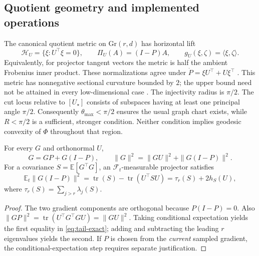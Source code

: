 \subsection{Quotient geometry and implemented operations}

The canonical quotient metric on $\mathrm{Gr}(r,d)$ has horizontal lift
\begin{equation}
 \mathcal H_U=\{\xi:U^\top\xi=0\},\qquad
 \Pi_U(A)=(I-P)A,\qquad g_U(\xi,\zeta)=\langle\xi,\zeta\rangle.
\end{equation}
Equivalently, for projector tangent vectors the metric is half the ambient
Frobenius inner product. These normalizations agree under
$\dot P=\xi U^\top+U\xi^\top$ \cite{bendokat2024grassmann}.
This metric has nonnegative sectional curvature bounded by $2$; the upper
bound need not be attained in every low-dimensional case
\cite{zimmermann2024curvature}. The injectivity radius is $\pi/2$.
The cut locus relative to $[U_\star]$ consists of subspaces having at least
one principal angle $\pi/2$. Consequently $\theta_{\max}<\pi/2$ ensures
the usual graph chart exists, while $R<\pi/2$ is a sufficient, stronger
condition. Neither condition implies geodesic convexity of $\Phi$ throughout
that region.

\begin{lemma}
\label{lem:decomposition}
For every $G$ and orthonormal $U$,
\begin{equation}
 G=GP+G(I-P),\qquad
 \|G\|^2=\|GU\|^2+\|G(I-P)\|^2.
\end{equation}
For a covariance $S=\mathbb E[G^\top G]$, an
$\mathcal F_t$-measurable projector satisfies
\begin{equation}
 \mathbb E_t\|G(I-P)\|^2
 =\operatorname{tr}(S)-\operatorname{tr}(U^\top SU)
 =\tau_r(S)+2h_S(U),\label{eq:tail-exact}
\end{equation}
where $\tau_r(S)=\sum_{j>r}\lambda_j(S)$.
\end{lemma}
\begin{proof}
The two gradient components are orthogonal because $P(I-P)=0$. Also
$\|GP\|^2=\operatorname{tr}(U^\top G^\top GU)=\|GU\|^2$.
Taking conditional expectation yields the first equality in
\eqref{eq:tail-exact}; adding and subtracting the leading $r$ eigenvalues
yields the second. If $P$ is chosen from the \emph{current} sampled gradient,
the conditional-expectation step requires separate justification.
\end{proof}

